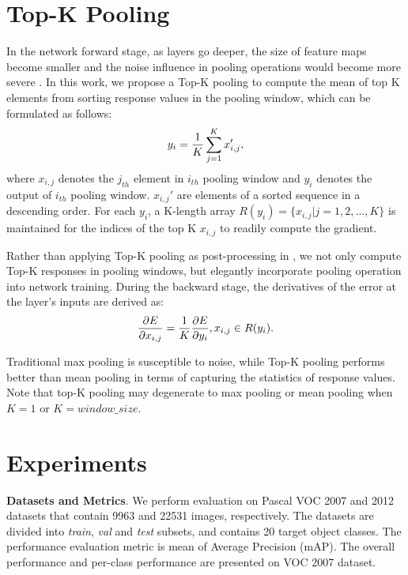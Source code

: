 \documentclass{article}
\begin{document}
{\section{Top-K Pooling}
\label{sec:pagestyle}

In the network forward stage, as layers go deeper, the size of feature maps become smaller and the noise influence in pooling operations would become more severe \cite{zhi2016two}. In this work, we propose a Top-K pooling to compute the mean of top K elements from sorting response values in the pooling window, which can be formulated as follows:
\begin{equation}
 \vspace{-5pt}
y_{i}= \frac {1}{K} \sum_{j=1}^{K} {x_{i,j}',}
\end{equation}
where $x_{i,j}$ denotes the $j_{th}$ element in $i_{th}$ pooling window and ${y_{i}}$ denotes the output of $i_{th}$ pooling window. ${x_{i,j}'}$ are elements of a sorted sequence in a descending order. For each $y_{i}$, a K-length array $R({y_{i}}) = \{x_{i, j} | j=1,2,...,K \}$ is maintained for the indices of the top K $x_{i,j}$ to readily compute the gradient.

Rather than applying Top-K pooling as post-processing in \cite{zhi2016two}, we not only compute Top-K responses in pooling windows, but elegantly incorporate pooling operation into network training. During the backward stage, the derivatives of the error at the layer's inputs are derived as:
\begin{equation}
\frac{ \partial E}{ \partial x_{i,j}} = \frac {1}{K} \frac{ \partial E}{ \partial y_{i}}, x_{i,j} \in R( y_{i}).
 \vspace{-3pt}
\end{equation}

Traditional max pooling is susceptible to noise, while Top-K pooling performs better than mean pooling in terms of capturing the statistics of response values. Note that top-K pooling may degenerate to max pooling or mean pooling when $K=1$ or $K=window\_size$.

\section{Experiments}
\label{sec:majhead}
\textbf{Datasets and Metrics}. We perform evaluation on Pascal VOC 2007 and 2012 datasets that contain 9963 and 22531 images, respectively. The datasets are divided into \textit{train}, \textit{val} and \textit{test} subsets, and contains 20 target object classes. The performance evaluation metric is mean of Average Precision (mAP). The overall performance and per-class performance are presented on VOC 2007 dataset.

}
\end{document}
